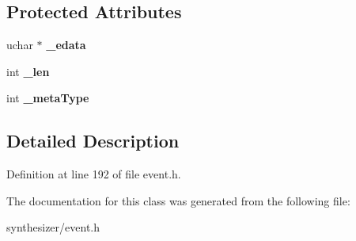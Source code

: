 \subsection*{Protected Attributes}
\begin{DoxyCompactItemize}
\item 
\mbox{\label{class_ms_1_1_midi_event_ae3b57ac2bb0a81ff44b71603cd650397}} 
uchar $\ast$ {\bfseries \+\_\+edata}
\item 
\mbox{\label{class_ms_1_1_midi_event_a284fb2b9207a7be5d1e6a4ba12a2e8d7}} 
int {\bfseries \+\_\+len}
\item 
\mbox{\label{class_ms_1_1_midi_event_ade961b66e7a15a01a57feafcdacbefc1}} 
int {\bfseries \+\_\+meta\+Type}
\end{DoxyCompactItemize}


\subsection{Detailed Description}


Definition at line 192 of file event.\+h.



The documentation for this class was generated from the following file\+:\begin{DoxyCompactItemize}
\item 
synthesizer/event.\+h\end{DoxyCompactItemize}
